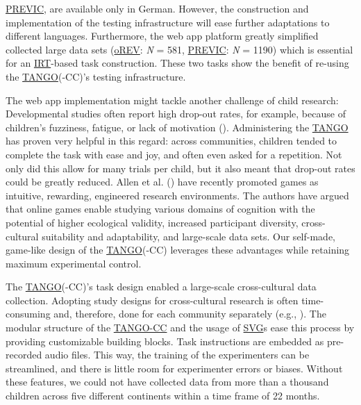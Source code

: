 \documentclass[
]{scrbook}
\begin{document}
\hyperref[acronyms_PREVIC]{PREVIC}, are available only in German. However, the construction and implementation of the testing infrastructure will ease further adaptations to different languages. Furthermore, the web app platform greatly simplified collected large data sets (\hyperref[acronyms_oREV]{oREV}: \emph{N} = 581, \hyperref[acronyms_PREVIC]{PREVIC}: \emph{N} = 1190) which is essential for an \hyperref[acronyms_IRT]{IRT}-based task construction. These two tasks show the benefit of re-using the \hyperref[acronyms_TANGO]{TANGO}(-CC)'s testing infrastructure.

The web app implementation might tackle another challenge of child research: Developmental studies often report high drop-out rates, for example, because of children's fuzziness, fatigue, or lack of motivation (). Administering the \hyperref[acronyms_TANGO]{TANGO} has proven very helpful in this regard: across communities, children tended to complete the task with ease and joy, and often even asked for a repetition. Not only did this allow for many trials per child, but it also meant that drop-out rates could be greatly reduced. Allen et al. () have recently promoted games as intuitive, rewarding, engineered research environments. The authors have argued that online games enable studying various domains of cognition with the potential of higher ecological validity, increased participant diversity, cross-cultural suitability and adaptability, and large-scale data sets. Our self-made, game-like design of the \hyperref[acronyms_TANGO]{TANGO}(-CC) leverages these advantages while retaining maximum experimental control.

The \hyperref[acronyms_TANGO]{TANGO}(-CC)'s task design enabled a large-scale cross-cultural data collection. Adopting study designs for cross-cultural research is often time-consuming and, therefore, done for each community separately (e.g., ). The modular structure of the \hyperref[acronyms_TANGO-CC]{TANGO-CC} and the usage of \hyperref[acronyms_SVG]{SVG}s ease this process by providing customizable building blocks. Task instructions are embedded as pre-recorded audio files. This way, the training of the experimenters can be streamlined, and there is little room for experimenter errors or biases. Without these features, we could not have collected data from more than a thousand children across five different continents within a time frame of 22 months.
\end{document}
